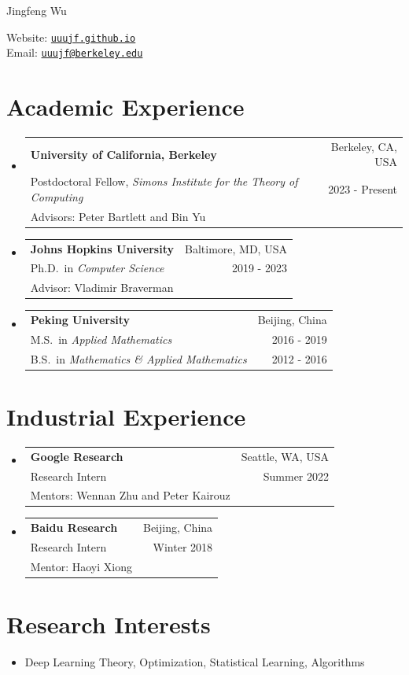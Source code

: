 \documentclass[letterpaper,11pt]{article}
\makeatletter
\newcommand{\outerlist}[1]{
    \begin{itemize}[leftmargin=*] #1 \end{itemize}}
\newcommand{\entry}[1]{\item[] #1}
\newcommand{\entryBig}[7][]{\item[#1]
    \begin{tabular*}{0.97\textwidth}{l@{\extracolsep{\fill}}r}
    \textbf{\large #2} & {\large #3} \\ #4 &  #5 \\  #6 & #7 \\ \end{tabular*}}
\makeatother
\begin{document}
\begin{minipage}[t]{0.60\textwidth}
\vspace*{\fill}
\Huge Jingfeng Wu
\end{minipage}
\begin{minipage}[t]{0.35\textwidth}
\begin{flushright}
 Website: \href{https://uuujf.github.io}{\texttt{uuujf.github.io}} \\ 
Email: \href{mailto:uuujf@berkeley.edu}{\tt uuujf@berkeley.edu}
\end{flushright}
\end{minipage}


\section{Academic Experience}
\outerlist{
\entryBig
	{University of California, Berkeley}{Berkeley, CA, USA}
	{{Postdoctoral Fellow, \emph{Simons Institute for the Theory of Computing}}}{2023 - Present}
	{Advisors: Peter Bartlett and Bin Yu}{}
\entryBig
{Johns Hopkins University}{Baltimore, MD, USA}
{Ph.D.\ in \emph{Computer Science}}{2019 - 2023}
{Advisor: Vladimir Braverman}{}
\entryBig
{Peking University}{Beijing, China}
{M.S.\ in  \emph{Applied Mathematics}}{2016 - 2019}
{B.S.\ in \emph{Mathematics \& Applied Mathematics}}{2012 - 2016}
}

\section{Industrial Experience}
\outerlist{
\entryBig
	{Google Research}{Seattle, WA, USA}
	{Research Intern}{Summer 2022}
	{Mentors: Wennan Zhu and Peter Kairouz}{}
\entryBig
	{Baidu Research}{Beijing, China}
	{Research Intern}{Winter 2018}
	{Mentor: Haoyi Xiong}{}
}

\section{Research Interests}
\outerlist{
\entry{Deep Learning Theory, Optimization, Statistical Learning, Algorithms}
}

\nocite{*}
\printbibliography[title=Preprint \textnormal{\footnotesize (* indicates equal contribution or alphabetical order)},type=misc]
\printbibliography[title=Conference Papers \textnormal{\footnotesize (* indicates equal contribution or alphabetical order)},type=inproceedings]
\printbibliography[title=Journal Papers \textnormal{\footnotesize (* indicates equal contribution or alphabetical order)},type=article]
\end{document}
